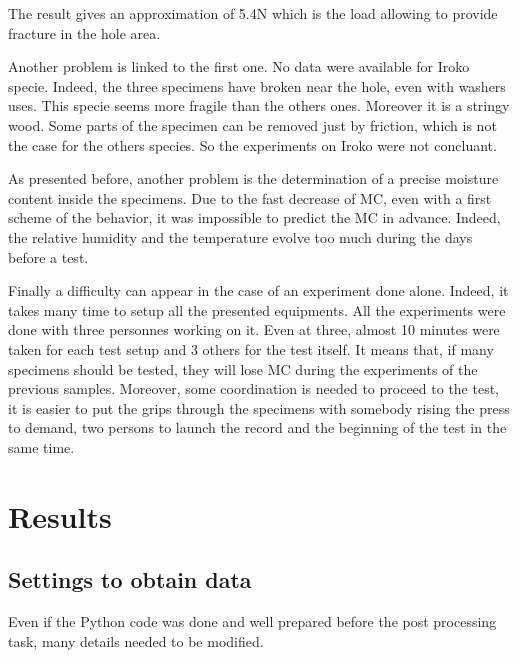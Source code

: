 The result gives an approximation of 5.4\si{\newton} which is the load allowing to provide fracture in the hole area.

Another problem is linked to the first one. No data were available for Iroko specie. Indeed, the three specimens have broken near the hole, even with washers uses. This specie seems more fragile than the others ones. Moreover it is a stringy wood. Some parts of the specimen can be removed just by friction, which is not the case for the others species. So the experiments on Iroko were not concluant.

As presented before, another problem is the determination of a precise moisture content inside the specimens. Due to the fast decrease of MC, even with a first scheme of the behavior, it was impossible to predict the MC in advance. Indeed, the relative humidity and the temperature evolve too much during the days before a test. 

Finally a difficulty can appear in the case of an experiment done alone. Indeed, it takes many time to setup all the presented equipments. All the experiments were done with three personnes working on it. Even at three, almost 10 minutes were taken for each test setup and 3 others for the test itself. It means that, if many specimens should be tested, they will lose MC during the experiments of the previous samples. Moreover, some coordination is needed to proceed to the test, it is easier to put the grips through the specimens with somebody rising the press to demand, two persons to launch the record and the beginning of the test in the same time.

\section{Results}

\subsection{Settings to obtain data}

Even if the Python code was done and well prepared before the post processing task, many details needed to be modified.

